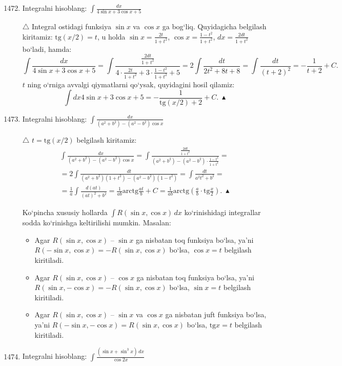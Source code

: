 \begin{enumerate}\setcounter{enumi}{1471}
	\item Integralni hisoblang: $\int\frac{dx}{4\sin x+3\cos x+5}$
	
	$\triangle$ Integral ostidagi funksiya $\sin x$ va $\cos x$ ga bog`liq. Quyidagicha belgilash kiritamiz: $\textrm{tg} (x/2)=t$, u holda $\sin x=\frac{2t}{1+t^2}$, $\cos x=\frac{1-t^2}{1+t^2}$, $dx=\frac{2dt}{1+t^2}$ bo`ladi, hamda:
	$$\int\frac{dx}{4\sin x+3\cos x+5}=\int\frac{\frac{2dt}{1+t^2}}{4\cdot\frac{2t}{1+t^2}+3\cdot\frac{1-t^2}{1+t^2}+5}=2\int\frac{dt}{2t^2+8t+8}=\int\frac{dt}{(t+2)^2}=-\frac{1}{t+2}+C.$$
	$t$ ning o`rniga avvalgi qiymatlarni qo`ysak, quyidagini hosil qilamiz:
	$$\int{dx}{4\sin x+3\cos x+5}=-\frac{1}{\textrm{tg}(x/2)+2}+C.\ \blacktriangle$$
	
	\item Integralni hisoblang: $\int\frac{dx}{(a^2+b^2)-(a^2-b^2)\cos x}$
	
	$\triangle$ $t=\textrm{tg}(x/2)$ belgilash kiritamiz:
\begin{multline*}
		\int\frac{dx}{(a^2+b^2)-(a^2-b^2)\cos x}=\int\frac{\frac{2dt}{1+t^2}}{(a^2+b^2)-(a^2-b^2)\cdot\frac{1-t^2}{1+t^2}}=\\=2\int\frac{dt}{(a^2+b^2)(1+t^2)-(a^2-b^2)(1-t^2)}=\int\frac{dt}{a^2t^2+b^2}=\\
		=\frac{1}{a}\int\frac{d(at)}{(at)^2+b^2}=\frac{1}{ab}\textrm{arctg}\frac{at}{b}+C=\frac{1}{ab}\textrm{arctg}\left(\frac{a}{b}\cdot\textrm{tg}\frac{x}{2}\right).\ \blacktriangle
\end{multline*}

Ko`pincha xususiy hollarda $\int R(\sin x, \cos x)\,dx$ ko`rinishidagi integrallar sodda ko`rinishga keltirilishi mumkin. Masalan:
\begin{itemize}
	\item Agar $R(\sin x, \cos x)$ -- $\sin x$ ga nisbatan toq funksiya bo`lsa, ya'ni $R(-\sin x, \cos x)=-R(\sin x, \cos x)$ bo`lsa, $\cos x=t$ belgilash kiritiladi.
	\item Agar $R(\sin x, \cos x)$ -- $\cos x$ ga nisbatan toq funksiya bo`lsa, ya'ni $R(\sin x, -\cos x)=-R(\sin x, \cos x)$ bo`lsa, $\sin x=t$ belgilash kiritiladi.
	\item Agar $R(\sin x, \cos x)$ -- $\sin x$ va $\cos x$ ga nisbatan juft  funksiya bo`lsa, ya'ni $R(-\sin x, -\cos x)=R(\sin x, \cos x)$ bo`lsa, $\textrm{tg} x=t$ belgilash kiritiladi.
\end{itemize}

\item Integralni hisoblang: $\int\frac{(\sin x+\sin^3 x)\,dx}{\cos 2x}$


\end{enumerate}
